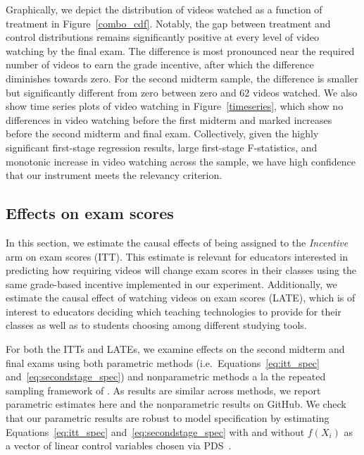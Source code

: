\documentclass[12pt]{article}
\begin{document}
Graphically, we depict the distribution of videos watched as a function of treatment in Figure~\ref{combo_cdf}.
Notably, the gap between treatment and control distributions remains significantly positive at every level of video watching by the final exam.
The difference is most pronounced near the required number of videos to earn the grade incentive, after which the difference diminishes towards zero.
For the second midterm sample, the difference is smaller but significantly different from zero between zero and 62 videos watched.
We also show time series plots of video watching in Figure~\ref{timeseries}, which show no differences in video watching before the first midterm and marked increases before the second midterm and final exam.
Collectively, given the highly significant first-stage regression results, large first-stage F-statistics, and monotonic increase in video watching across the sample, we have high confidence that our instrument meets the relevancy criterion.

\subsection{Effects on exam scores}\label{subsec:effects}

In this section, we estimate the causal effects of being assigned to the \textit{Incentive} arm on exam scores (ITT).
This estimate is relevant for educators interested in predicting how requiring videos will change exam scores in their classes using the same grade-based incentive implemented in our experiment.
Additionally, we estimate the causal effect of watching videos on exam scores (LATE), which is of interest to educators deciding which teaching technologies to provide for their classes as well as to students choosing among different studying tools.

For both the ITTs and LATEs, we examine effects on the second midterm and final exams using both parametric methods (i.e.\ Equations~\ref{eq:itt_spec} and~\ref{eq:secondstage_spec}) and nonparametric methods a la the repeated sampling framework of \textcite{neyman1923}.
As results are similar across methods, we report parametric estimates here and the nonparametric results on GitHub.
We check that our parametric results are robust to model specification by estimating Equations~\ref{eq:itt_spec} and~\ref{eq:secondstage_spec} with and without $f(X_i)$ as a vector of linear control variables chosen via PDS~\parencite{bch2014a}.
\end{document}
